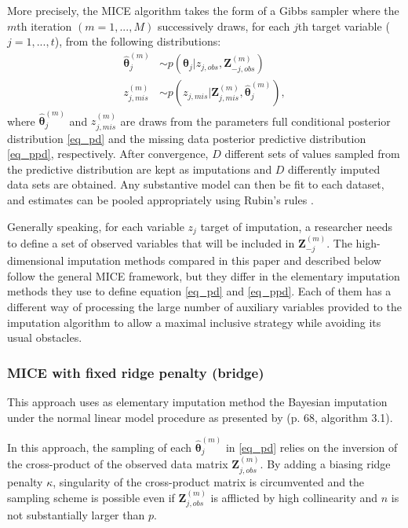More precisely, the MICE algorithm takes the form of a Gibbs sampler where the $m$th iteration $(m = 1, ..., M)$
successively draws, for each $j$th target variable ($j = 1, ..., t$), from the following distributions:
%
	\begin{align}
	\hat{\bm{\theta}}_{j}^{(m)} &\sim 
		p(\bm{\theta}_j | z_{j, obs}, \bm{Z}_{-j, obs}^{(m)}) 
		\label{eq_pd}\\
	z_{j, mis}^{(m)} &\sim 
		p(z_{j, mis} | \bm{Z}_{j, mis}^{(m)}, \hat{\bm{\theta}}_{j}^{(m)}) 
		\label{eq_ppd},
	\end{align}
%
where $\hat{\bm{\theta}}_{j}^{(m)}$ and $z_{j, mis}^{(m)}$ are draws from the parameters full conditional posterior 
distribution \eqref{eq_pd} and the missing data posterior predictive distribution \eqref{eq_ppd}, respectively.
After convergence, $D$ different sets of values sampled from the predictive distribution are kept as imputations 
and $D$ differently imputed data sets are obtained. 
Any substantive model can then be fit to each dataset, and estimates can be pooled appropriately using Rubin's rules
\citep{rubin:1987}.

Generally speaking, for each variable $z_j$ target of imputation, a researcher needs to define a set of 
observed variables that will be included in $\bm{Z}_{-j}^{(m)}$.
The high-dimensional imputation methods compared in this paper and described below follow the general MICE framework,
but they differ in the elementary imputation methods they use to define equation \eqref{eq_pd} and \eqref{eq_ppd}.
Each of them has a different way of processing the large number of auxiliary variables provided to the 
imputation algorithm to allow a maximal inclusive strategy while avoiding its usual obstacles.

\subsubsection{MICE with fixed ridge penalty (bridge)}
	This approach uses as elementary imputation method the Bayesian imputation under the normal linear model 
	procedure as presented by \cite{vanBuuren:2012} (p. 68, algorithm 3.1).

	In this approach, the sampling of each $\hat{\bm{\theta}}_{j}^{(m)}$ in \eqref{eq_pd} relies on the inversion
	of the cross-product of the observed data matrix $\bm{Z}_{j, obs}^{(m)}$.
	By adding a biasing ridge penalty $\kappa$, singularity of the cross-product matrix is circumvented and the 
	sampling scheme is possible even if $\bm{Z}_{j, obs}^{(m)}$ is afflicted by high collinearity and $n$ is not 
	substantially larger than $p$.

